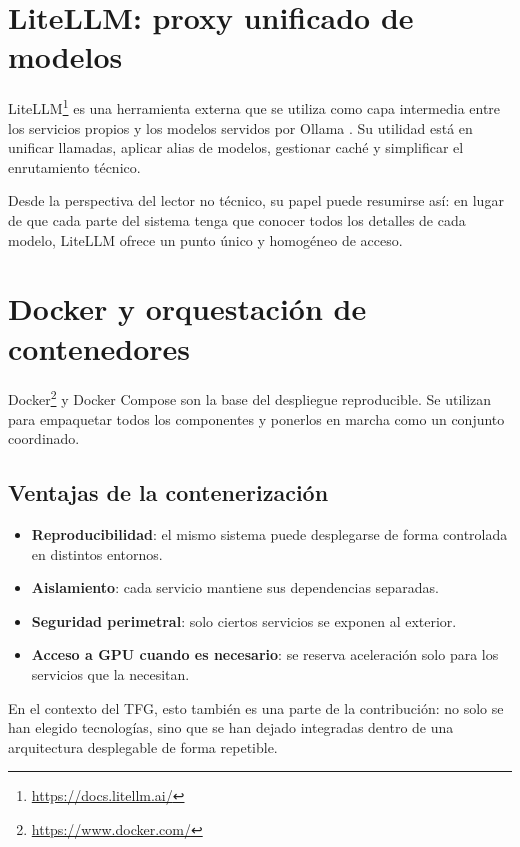 \section{LiteLLM: proxy unificado de modelos}
\label{sec:litellm}

LiteLLM\footnote{\url{https://docs.litellm.ai/}} es una herramienta externa que se utiliza como capa intermedia entre los servicios propios y los modelos servidos por Ollama \cite{litellm2024docs}. Su utilidad está en unificar llamadas, aplicar alias de modelos, gestionar caché y simplificar el enrutamiento técnico.

Desde la perspectiva del lector no técnico, su papel puede resumirse así: en lugar de que cada parte del sistema tenga que conocer todos los detalles de cada modelo, LiteLLM ofrece un punto único y homogéneo de acceso.

\section{Docker y orquestación de contenedores}
\label{sec:docker}

Docker\footnote{\url{https://www.docker.com/}} y Docker Compose son la base del despliegue reproducible. Se utilizan para empaquetar todos los componentes y ponerlos en marcha como un conjunto coordinado.

\subsection{Ventajas de la contenerización}

\begin{itemize}
    \item \textbf{Reproducibilidad}: el mismo sistema puede desplegarse de forma controlada en distintos entornos.
    \item \textbf{Aislamiento}: cada servicio mantiene sus dependencias separadas.
    \item \textbf{Seguridad perimetral}: solo ciertos servicios se exponen al exterior.
    \item \textbf{Acceso a GPU cuando es necesario}: se reserva aceleración solo para los servicios que la necesitan.
\end{itemize}

En el contexto del TFG, esto también es una parte de la contribución: no solo se han elegido tecnologías, sino que se han dejado integradas dentro de una arquitectura desplegable de forma repetible.

